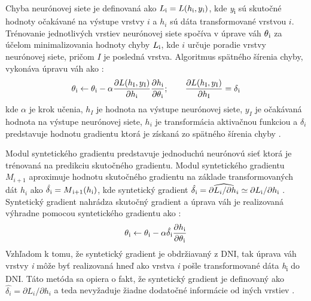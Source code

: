 Chyba neurónovej siete je definovaná ako $L\textsubscript{i}=L(h\textsubscript{i},y\textsubscript{i})$, kde \textit{y}\textsubscript{i} sú skutočné hodnoty očakávané na výstupe vrstvy $i$ a $h_i$ sú dáta transformované vrstvou $i$. Trénovanie jednotlivých vrstiev neurónovej siete spočíva v úprave váh $\theta\textsubscript{i}$ za účelom minimalizovania hodnoty chyby $L\textsubscript{i}$, kde $i$ určuje poradie vrstvy neurónovej siete, pričom $I$ je posledná vrstva. Algoritmus spätného šírenia chyby, vykonáva úpravu váh ako \cite{Jaderberg2016, Goh1995}:
\begin{equation}
    \theta\textsubscript{i} \leftarrow \theta\textsubscript{i} - \alpha \frac{\partial L (h\textsubscript{I},y\textsubscript{I})}{\partial h \textsubscript{i}}\frac{\partial h \textsubscript{i}}{\partial \theta \textsubscript{i}} ;\qquad \frac{\partial L(h\textsubscript{I},y\textsubscript{I})}{\partial h \textsubscript{I}} = \delta\textsubscript{i}
\end{equation}
kde $\alpha$ je krok učenia, $h_I$ je hodnota na výstupe neurónovej siete, $y_I$ je očakávaná hodnota na výstupe neurónovej siete, $h_i$ je transformácia aktivačnou funkciou a $\delta_i$ predstavuje hodnotu gradientu ktorá je získaná zo spätného šírenia chyby \cite{Czarnecki2017, Goh1995, Jaderberg2016}.

 
 Modul syntetického gradientu predstavuje jednoduchú neurónovú sieť ktorá je trénovaná na predikciu skutočného gradientu. Modul syntetického gradientu $M_{i+1}$ aproximuje hodnotu skutočného gradientu na základe transformovaných dát $h_i$ ako $\hat{\delta\textsubscript{i}}=M\textsubscript{i+1}(h\textsubscript{i})$, kde syntetický gradient $\hat{\delta\textsubscript{i}} = \widehat{\partial L_i/\partial h_i}\simeq\partial L\textsubscript{i}/\partial h \textsubscript{i}$ \cite{Czarnecki2017}. Syntetický gradient nahrádza skutočný gradient a úprava váh je realizovaná výhradne pomocou syntetického gradientu ako \cite{Jaderberg2016}:
\begin{equation}
    \theta\textsubscript{i} \leftarrow \theta\textsubscript{i} - \alpha \hat{\delta\textsubscript{i}}\frac{\partial h \textsubscript{i}}{\partial \theta \textsubscript{i}}
\end{equation}
Vzhľadom k tomu, že syntetický gradient je obdržiavaný z DNI, tak úprava váh vrstvy \textit{i} môže byť realizovaná hneď ako vrstva \textit{i} pošle transformované dáta \textit{h}\textsubscript{i} do DNI. Táto metóda sa opiera o fakt, že syntetický gradient je definovaný ako $\hat{\delta_i} = \partial L_i / \partial h_i$ a teda nevyžaduje žiadne dodatočné informácie od iných vrstiev \cite{Czarnecki2017}.

